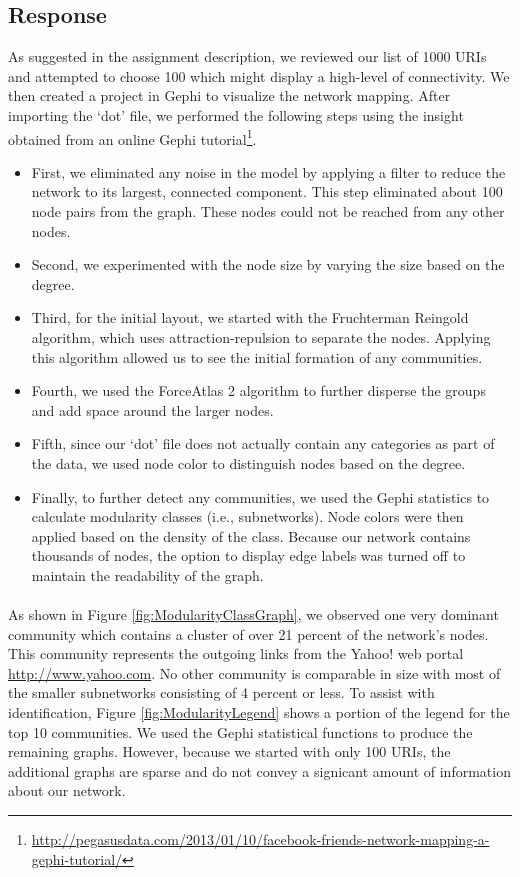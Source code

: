 \documentclass[letterpaper,11pt]{report}
\begin{document}
\begin{savenotes}
\subsection{Response}As suggested in the assignment description, we reviewed our list of 1000 URIs and attempted to choose 100 which might display a high-level of connectivity. We then created a project in Gephi to visualize the network mapping. After importing the `dot' file, we performed the following steps using the insight obtained from an online Gephi tutorial\footnote{\url{http://pegasusdata.com/2013/01/10/facebook-friends-network-mapping-a-gephi-tutorial/}}.
\begin{itemize}
\item First, we eliminated any noise in the model by applying a filter to reduce the network to its largest, connected component. This step eliminated about 100 node pairs from the graph. These nodes could not be reached from any other nodes.
\item Second, we experimented with the node size by varying the size based on the degree.
\item Third, for the initial layout, we started with the Fruchterman Reingold algorithm, which uses attraction-repulsion to separate the nodes. Applying this algorithm allowed us to see the initial formation of any communities.
\item Fourth, we used the ForceAtlas 2 algorithm to further disperse the groups and add space around the larger nodes.
\item Fifth, since our `dot' file does not actually contain any categories as part of the data, we used node color to distinguish nodes based on the degree.
\item Finally, to further detect any communities, we used the Gephi statistics to calculate modularity classes (i.e., subnetworks). Node colors were then applied based on the density of the class. Because our network contains thousands of nodes, the option to display edge labels was turned off to maintain the readability of the graph. 
\end{itemize}
\paragraph{}As shown in Figure \ref{fig:ModularityClassGraph}, we observed one very dominant community which contains a cluster of over 21 percent of the network's nodes. This community represents the outgoing links from the Yahoo! web portal \url{http://www.yahoo.com}. No other community is comparable in size with most of the smaller subnetworks consisting of 4 percent or less. To assist with identification, Figure \ref{fig:ModularityLegend} shows a portion of the legend for the top 10 communities. We used the Gephi statistical functions to produce the remaining graphs. However, because we started with only 100 URIs, the additional graphs are sparse and do not convey a signicant amount of information about our network.


\end{savenotes}
\end{document}
